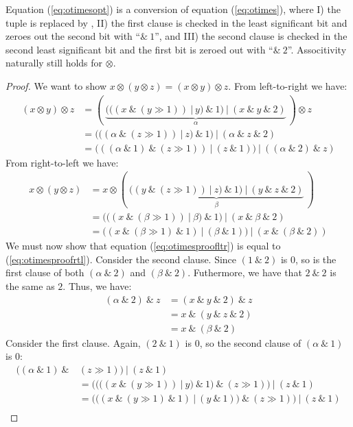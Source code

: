 Equation (\ref{eq:otimesopt}) is a conversion of equation (\ref{eq:otimes}),
where I) the tuple is replaced by , II) the first clause is checked in
the least significant bit and zeroes out the second bit with ``$\&~1$'', and
III) the second clause is checked in the second least significant bit and the
first bit is zeroed out with ``$\&~2$''. Associtivity naturally still holds for
$\otimes$.

\begin{proof}
  We want to show $x \otimes (y \otimes z) = (x \otimes y) \otimes z$. From left-to-right we have:
\begin{align}
  (x \otimes y) \otimes z &= (~\underbrace{(((x~\&~(y \gg 1))~|~y)~\&~1)~|~(x~\&~y~\&~2)}_{\alpha}~) \otimes z\\
              &= (((\alpha~\&~(z \gg 1))~|~z)~\&~1)~|~(\alpha~\&~z~\&~2)\\
              \label{eq:otimesproofltr}
              &= (((\alpha~\&~1)~\&~(z \gg 1))~|~(z~\&~1))~|~((\alpha~\&~2)~\&~z)
\end{align}
From right-to-left we have:
\begin{align}
  x \otimes (y \otimes z) &= x \otimes (~\underbrace{((y~\&~(z \gg 1))~|~z)~\&~1)~|~(y~\&~z~\&~2)}_{\beta}~)\\
  &= (((x~\&~(\beta \gg 1))~|~\beta)~\&~1)~|~(x~\&~\beta~\&~2)\\
  \label{eq:otimesproofrtl}
  &= ((x~\&~(\beta \gg 1)~\&~1)~|~(\beta~\&~1))~|~(x~\&~(\beta~\&~2))
\end{align}
We must now show that equation (\ref{eq:otimesproofltr}) is equal to
(\ref{eq:otimesproofrtl}). Consider the second clause. Since $(1~\&~2)$ is $0$,
so is the first clause of both $(\alpha~\&~2)$ and $(\beta~\&~2)$. Futhermore, we have
that $2~\&~2$ is the same as $2$. Thus, we have:
\begin{align}
  (\alpha~\&~2)~\&~z &= (x~\&~y~\&~2)~\&~z\\
                &= x~\&~(y~\&~z~\&~2)\\
                &= x~\&~(\beta~\&~2)
\end{align}
Consider the first clause. Again, $(2~\&~1)$ is $0$, so the second clause of $(\alpha~\&~1)$ is $0$:
\begin{align}
  ((\alpha~\&~1)~\&~&(z \gg 1))~|~(z~\&~1) \\
               &= ((((x~\&~(y \gg 1))~|~y)~\&~1)~\&~(z \gg 1))~|~(z~\&~1) \\
               &= (((x~\&~(y \gg 1)~\&~1)~|~(y~\&~1))~\&~(z \gg 1))~|~(z~\&~1) \\

\end{align}
\end{proof}
